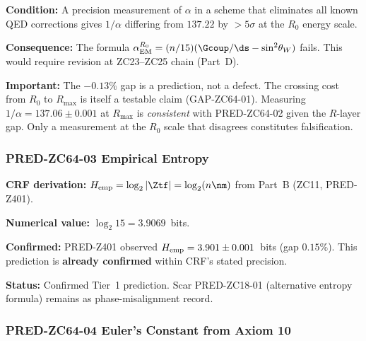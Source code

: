 \documentclass[12pt, a4paper]{article}
\renewcommand{\swsq}{\sin^2\!\theta_W}
\renewcommand{\aEM}{\alpha_{\rm EM}}
\begin{document}
\begin{fsbox}[title={FS-ZC64-02: Falsification of PRED-ZC64-02}]
\textbf{Condition:} A precision measurement of $\alpha$ in
a scheme that eliminates all known QED corrections gives
$1/\alpha$ differing from $137.22$ by $>\!5\sigma$ at
the $R_0$ energy scale.

\textbf{Consequence:} The formula
$\aEM^{R_0} = (n/15)(\Gcoup/\ds - \swsq)$ fails.
This would require revision at ZC23--ZC25 chain (Part~D).

\textbf{Important:} The $-0.13\%$ gap is a prediction, not
a defect. The crossing cost from $R_0$ to $R_{\max}$ is
itself a testable claim (GAP-ZC64-01).
Measuring $1/\alpha = 137.06 \pm 0.001$ at $R_{\max}$
is \emph{consistent} with PRED-ZC64-02 given the $R$-layer
gap. Only a measurement at the $R_0$ scale that disagrees
constitutes falsification.
\end{fsbox}

\subsubsection{PRED-ZC64-03 \quad Empirical Entropy}
\label{sec:pred03}

\begin{predbox}[title={PRED-ZC64-03: $H_{\rm emp} = \log_2 15$
  (Tier~1; inherits PRED-Z401)}]
\textbf{CRF derivation:} $H_{\rm emp} = \log_2|\Ztf| = \log_2(n\nm)$
from Part~B (ZC11, PRED-Z401).

\textbf{Numerical value:} $\log_2 15 = 3.9069$~bits.

\textbf{Confirmed:} PRED-Z401 observed $H_{\rm emp} = 3.901 \pm 0.001$~bits
(gap $0.15\%$). This prediction is \textbf{already confirmed}
within CRF's stated precision.

\textbf{Status:} Confirmed Tier~1 prediction.
Scar PRED-ZC18-01 (alternative entropy formula) remains
as phase-misalignment record.
\end{predbox}

\subsubsection{PRED-ZC64-04 \quad Euler's Constant from Axiom 10}
\label{sec:pred04}
\end{document}
